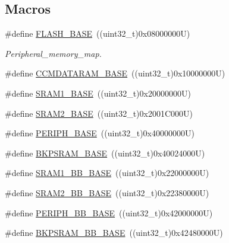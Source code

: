 \subsection*{Macros}
\begin{DoxyCompactItemize}
\item 
\#define \hyperlink{group___peripheral__registers__structures_ga23a9099a5f8fc9c6e253c0eecb2be8db}{F\+L\+A\+S\+H\+\_\+\+B\+A\+SE}~((uint32\+\_\+t)0x08000000\+U)
\begin{DoxyCompactList}\small\item\em Peripheral\+\_\+memory\+\_\+map. \end{DoxyCompactList}\item 
\#define \hyperlink{group___peripheral__registers__structures_gabea1f1810ebeac402164b42ab54bcdf9}{C\+C\+M\+D\+A\+T\+A\+R\+A\+M\+\_\+\+B\+A\+SE}~((uint32\+\_\+t)0x10000000\+U)
\item 
\#define \hyperlink{group___peripheral__registers__structures_ga7d0fbfb8894012dbbb96754b95e562cd}{S\+R\+A\+M1\+\_\+\+B\+A\+SE}~((uint32\+\_\+t)0x20000000\+U)
\item 
\#define \hyperlink{group___peripheral__registers__structures_gadbb42a3d0a8a90a79d2146e4014241b1}{S\+R\+A\+M2\+\_\+\+B\+A\+SE}~((uint32\+\_\+t)0x2001\+C000\+U)
\item 
\#define \hyperlink{group___peripheral__registers__structures_ga9171f49478fa86d932f89e78e73b88b0}{P\+E\+R\+I\+P\+H\+\_\+\+B\+A\+SE}~((uint32\+\_\+t)0x40000000\+U)
\item 
\#define \hyperlink{group___peripheral__registers__structures_ga52e57051bdf8909222b36e5408a48f32}{B\+K\+P\+S\+R\+A\+M\+\_\+\+B\+A\+SE}~((uint32\+\_\+t)0x40024000\+U)
\item 
\#define \hyperlink{group___peripheral__registers__structures_gac4c4f61082e4b168f29d9cf97dc3ca5c}{S\+R\+A\+M1\+\_\+\+B\+B\+\_\+\+B\+A\+SE}~((uint32\+\_\+t)0x22000000\+U)
\item 
\#define \hyperlink{group___peripheral__registers__structures_gac33cb6edadf184ab9860d77089503922}{S\+R\+A\+M2\+\_\+\+B\+B\+\_\+\+B\+A\+SE}~((uint32\+\_\+t)0x22380000\+U)
\item 
\#define \hyperlink{group___peripheral__registers__structures_gaed7efc100877000845c236ccdc9e144a}{P\+E\+R\+I\+P\+H\+\_\+\+B\+B\+\_\+\+B\+A\+SE}~((uint32\+\_\+t)0x42000000\+U)
\item 
\#define \hyperlink{group___peripheral__registers__structures_gaee19a30c9fa326bb10b547e4eaf4e250}{B\+K\+P\+S\+R\+A\+M\+\_\+\+B\+B\+\_\+\+B\+A\+SE}~((uint32\+\_\+t)0x42480000\+U)

\end{DoxyCompactItemize}
